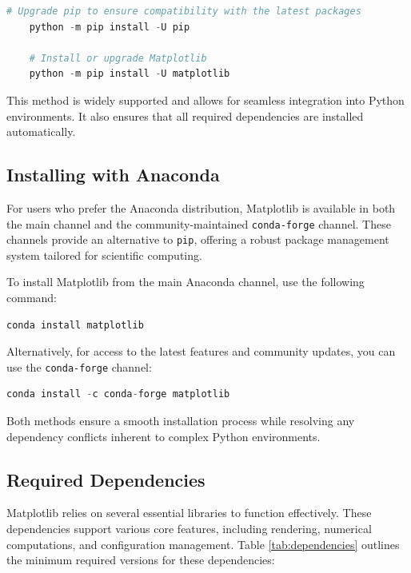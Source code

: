 \begin{lstlisting}[language=Python]
	# Upgrade pip to ensure compatibility with the latest packages
	python -m pip install -U pip 
	
	# Install or upgrade Matplotlib
	python -m pip install -U matplotlib
\end{lstlisting}

This method is widely supported and allows for seamless integration into Python environments. It also ensures that all required dependencies are installed automatically.

\subsection{Installing with Anaconda}

For users who prefer the Anaconda distribution, Matplotlib is available in both the main channel and the community-maintained \texttt{conda-forge} channel. These channels provide an alternative to \texttt{pip}, offering a robust package management system tailored for scientific computing.

To install Matplotlib from the main Anaconda channel, use the following command:
\begin{lstlisting}[language=Python]
	conda install matplotlib
\end{lstlisting}

Alternatively, for access to the latest features and community updates, you can use the \texttt{conda-forge} channel:
\begin{lstlisting}[language=Python]
	conda install -c conda-forge matplotlib
\end{lstlisting}

Both methods ensure a smooth installation process while resolving any dependency conflicts inherent to complex Python environments.

\subsection{Required Dependencies}

Matplotlib relies on several essential libraries to function effectively. These dependencies support various core features, including rendering, numerical computations, and configuration management. Table \ref{tab:dependencies} outlines the minimum required versions for these dependencies:

